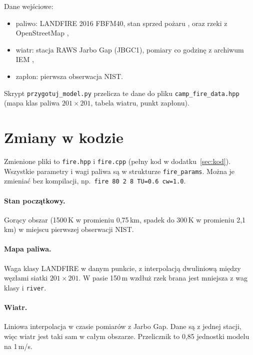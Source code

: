 \documentclass[11pt,a4paper]{article}
\begin{document}
Dane wejściowe:
\begin{itemize}
\item paliwo: LANDFIRE 2016 FBFM40, stan sprzed pożaru \cite{landfire}, oraz rzeki z OpenStreetMap \cite{osm},
\item wiatr: stacja RAWS Jarbo Gap (JBGC1), pomiary co godzinę z archiwum IEM \cite{iem},
\item zapłon: pierwsza obserwacja NIST.
\end{itemize}
Skrypt \texttt{przygotuj\_model.py} przelicza te dane do pliku \texttt{camp\_fire\_data.hpp}
(mapa klas paliwa $201\times201$, tabela wiatru, punkt zapłonu).

\section{Zmiany w kodzie}

Zmienione pliki to \texttt{fire.hpp} i \texttt{fire.cpp} (pełny kod w dodatku~\ref{sec:kod}).
Wszystkie parametry i wagi paliwa są w strukturze \texttt{fire\_params}.
Można je zmieniać bez kompilacji, np.\ \texttt{fire 80 2 8 TU=0.6 cw=1.0}.



\paragraph{Stan początkowy.} Gorący obszar (1500\,K w promieniu 0,75\,km, spadek do 300\,K
w promieniu 2,1\,km) w miejscu pierwszej obserwacji NIST.


\paragraph{Mapa paliwa.} Waga klasy LANDFIRE w danym punkcie, z interpolacją dwuliniową
między węzłami siatki $201\times201$. W pasie 150\,m wzdłuż rzek brana jest mniejsza
z wag klasy i \texttt{river}.


\paragraph{Wiatr.} Liniowa interpolacja w czasie pomiarów z Jarbo Gap. Dane są z jednej
stacji, więc wiatr jest taki sam w całym obszarze. Przelicznik to 0,85 jednostki modelu
na 1\,m/s.

\end{document}
